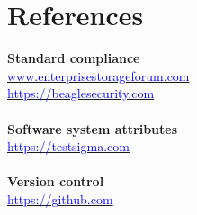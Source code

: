 \documentclass[11pt,twoside]{article}
\begin{document}
\section{References}
\textbf{Standard compliance}\\
\href{https://www.enterprisestorageforum.com/management/7-essential-compliance-regulations-for-data-storage-systems/}{\textcolor{blue}{www.enterprisestorageforum.com}}\\
\href{https://beaglesecurity.com/blog/article/software-compliance-standards.html}{\textcolor{blue}{https://beaglesecurity.com}}\\
\\
\textbf{Software system attributes}\\
\href{https://testsigma.com/blog/software-quality-attributes/}{\textcolor{blue}{https://testsigma.com}}\\
\\
\textbf{Version control}\\
\href{https://github.com/resources/articles/software-development/what-is-version-control}{\textcolor{blue}{https://github.com}}
\end{document}
